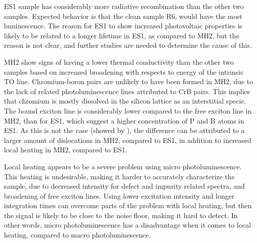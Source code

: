 ES1 sample has considerably more radiative recombination than the other two samples. Expected behavior is that the clean sample R6, would have the most luminescence. The reason for ES1 to show increased photovoltaic properties is likely to be related to a longer lifetime in ES1, as compared to MH2, but the reason is not clear, and further studies are needed to determine the cause of this.

MH2 show signs of having a lower thermal conductivity than the other two samples based on increased broadening with respects to energy of the intrinsic TO line. Chromium-boron pairs are unlikely to have been formed in MH2, due to the lack of related photoluminescence lines attributed to CrB pairs. This implies that chromium is mostly dissolved in the silicon lattice as an interstitial specie. The bound exciton line is considerably lower compared to the free exciton line in MH2, than for ES1, which suggest a higher concentration of P and B atoms in ES1. As this is not the case (showed by \cite{hystad09}), the difference can be attributed to a larger amount of dislocations in MH2, compared to ES1, in addition to increased local heating in MH2, compared to ES1.

Local heating appears to be a severe problem using micro photoluminescence. This heating is undesirable, making it harder to accurately characterize the sample, due to decreased intensity for defect and impurity related spectra, and broadening of free exciton lines. Using lower excitation intensity and longer integration times can overcome parts of the problem with local heating, but then the signal is likely to be close to the noise floor, making it hard to detect. In other words, micro photoluminescence has a disadvantage when it comes to local heating, compared to macro photoluminescence.